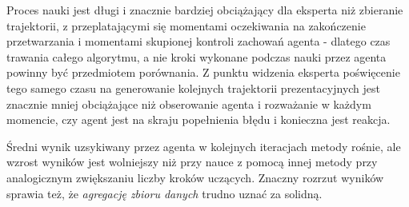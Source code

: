 Proces nauki jest długi i znacznie bardziej obciążający dla eksperta niż zbieranie trajektorii, z przeplatającymi się momentami oczekiwania na zakończenie przetwarzania i momentami skupionej kontroli zachowań agenta - dlatego czas trawania całego algorytmu, a nie kroki wykonane podczas nauki przez agenta powinny być przedmiotem porównania. Z punktu widzenia eksperta poświęcenie tego samego czasu na generowanie kolejnych trajektorii prezentacyjnych jest znacznie mniej obciążające niż obserowanie agenta i rozważanie w każdym momencie, czy agent jest na skraju popełnienia błędu i konieczna jest reakcja.

Średni wynik uzsykiwany przez agenta w kolejnych iteracjach metody rośnie, ale wzrost wyników jest wolniejszy niż przy nauce z pomocą innej metody przy analogicznym zwiększaniu liczby kroków uczących. Znaczny rozrzut wyników sprawia też, że \textit{agregację zbioru danych} trudno uznać za solidną.
